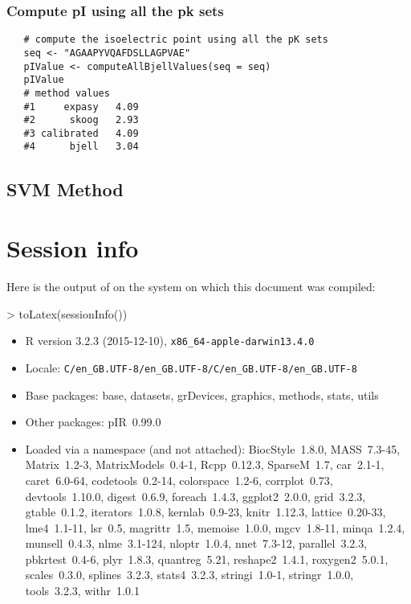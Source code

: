 \documentclass{article}
\begin{document}
\subsubsection{Compute pI using all the pk sets}

\begin{verbatim}
   # compute the isoelectric point using all the pK sets
   seq <- "AGAAPYVQAFDSLLAGPVAE"
   pIValue <- computeAllBjellValues(seq = seq)
   pIValue
   # method values
   #1     expasy   4.09
   #2      skoog   2.93
   #3 calibrated   4.09
   #4      bjell   3.04
\end{verbatim}

\subsection{SVM Method}


\section{Session info}

Here is the output of  on the system on which
this document was compiled:
\begin{Schunk}
\begin{Sinput}
> toLatex(sessionInfo())
\end{Sinput}
\begin{itemize}\raggedright
  \item R version 3.2.3 (2015-12-10), \verb|x86_64-apple-darwin13.4.0|
  \item Locale: \verb|C/en_GB.UTF-8/en_GB.UTF-8/C/en_GB.UTF-8/en_GB.UTF-8|
  \item Base packages: base, datasets, grDevices, graphics, methods, stats,
    utils
  \item Other packages: pIR~0.99.0
  \item Loaded via a namespace (and not attached): BiocStyle~1.8.0, MASS~7.3-45,
    Matrix~1.2-3, MatrixModels~0.4-1, Rcpp~0.12.3, SparseM~1.7, car~2.1-1,
    caret~6.0-64, codetools~0.2-14, colorspace~1.2-6, corrplot~0.73,
    devtools~1.10.0, digest~0.6.9, foreach~1.4.3, ggplot2~2.0.0, grid~3.2.3,
    gtable~0.1.2, iterators~1.0.8, kernlab~0.9-23, knitr~1.12.3,
    lattice~0.20-33, lme4~1.1-11, lsr~0.5, magrittr~1.5, memoise~1.0.0,
    mgcv~1.8-11, minqa~1.2.4, munsell~0.4.3, nlme~3.1-124, nloptr~1.0.4,
    nnet~7.3-12, parallel~3.2.3, pbkrtest~0.4-6, plyr~1.8.3, quantreg~5.21,
    reshape2~1.4.1, roxygen2~5.0.1, scales~0.3.0, splines~3.2.3, stats4~3.2.3,
    stringi~1.0-1, stringr~1.0.0, tools~3.2.3, withr~1.0.1
\end{itemize}\end{Schunk}


\end{document}
